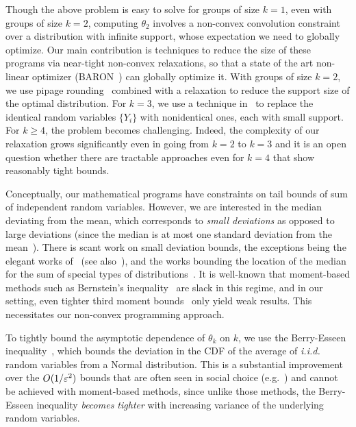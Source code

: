 Though the above problem is easy to solve for groups of size $k=1$, even with groups of size $k = 2$, computing $\theta_2$ involves a non-convex convolution constraint over a distribution with infinite support,  whose expectation we need to globally optimize. Our main contribution is techniques to reduce the size of these programs via near-tight non-convex relaxations, so that a state of the art non-linear optimizer (BARON~\cite{Sahinidis1996,KS18}) can globally optimize it. With groups of size $k = 2$, we use pipage rounding~\cite{Ageev2004} combined with a relaxation to reduce the support size of the optimal distribution. For $k=3$, we use a technique in~\cite{Feige} to replace the identical random variables $\{Y_i\}$ with nonidentical ones, each with small support.  For $k \ge 4$, the problem becomes challenging. Indeed, the complexity of our relaxation grows significantly even in going from $k=2$ to $k=3$ and it is an open question whether there are tractable approaches even for $k=4$ that show reasonably tight bounds.

Conceptually, our mathematical programs have constraints on tail bounds of sum of independent random variables. However, we are interested in the median deviating from the mean, which corresponds to {\em small deviations} as opposed to large deviations (since the median is at most one standard deviation from the mean~\cite{MU}). There is scant work on small deviation bounds, the exceptions being the elegant works of~\cite{Feige,BertsimasP} (see also~\cite{HeZZ10}), and the works bounding the location of the median for the sum of special types of distributions~\cite{Siegel,Binomial,Poisson}. It is well-known that moment-based methods such as Bernstein's inequality~\cite{Boucheron} are slack in this regime, and in our setting, even tighter third moment bounds~\cite{BertsimasP} only yield weak results. This necessitates our non-convex programming approach. 

To tightly bound the asymptotic dependence of $\theta_k$ on $k$, we use the Berry-Esseen inequality~\cite{feller1971introduction}, which bounds the deviation in the CDF of the average of {\em i.i.d.} random variables from a Normal distribution. This is a substantial improvement over the $O(1/\varepsilon^2)$ bounds that are often seen in social choice (e.g.~\cite{CaragiannisM024}) and cannot be achieved with moment-based methods, since unlike those methods, the Berry-Esseen inequality {\em becomes tighter} with increasing variance of the underlying random variables. %


